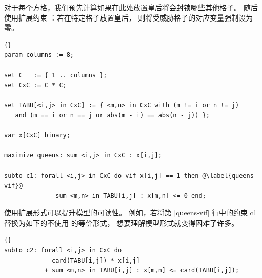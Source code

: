 对于每个方格，我们预先计算如果在此处放置皇后将会封锁哪些其他格子。
随后使用扩展约束 ：若在特定格子放置皇后，
则将受威胁格子的对应变量强制设为零。

\medskip
\begin{lstlisting}[frame=tb]{}
param columns := 8;

set C   := { 1 .. columns };
set CxC := C * C;

set TABU[<i,j> in CxC] := { <m,n> in CxC with (m != i or n != j)
   and (m == i or n == j or abs(m - i) == abs(n - j)) };

var x[CxC] binary;

maximize queens: sum <i,j> in CxC : x[i,j];

subto c1: forall <i,j> in CxC do vif x[i,j] == 1 then @\label{queens-vif}@
              sum <m,n> in TABU[i,j] : x[m,n] <= 0 end;
\end{lstlisting}

\medskip
\noindent 使用扩展形式可以提升模型的可读性。
例如，若将第 \ref{queens-vif} 行中的约束 c1 
替换为如下的不使用  的等价形式，
想要理解模型形式就变得困难了许多。
\medskip
{}
\begin{lstlisting}[firstnumber=13]{}
subto c2: forall <i,j> in CxC do
             card(TABU[i,j]) * x[i,j]
           + sum <m,n> in TABU[i,j] : x[m,n] <= card(TABU[i,j]);
\end{lstlisting}

